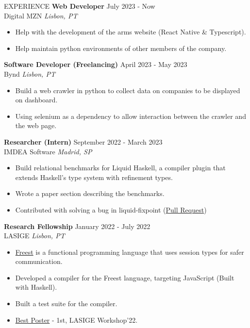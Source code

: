 \documentclass{resume} %
\begin{document}

\begin{rSection}{EXPERIENCE}
  \textbf{Web Developer} \hfill July 2023 - Now\\
  Digital MZN \hfill \textit{Lisbon, PT}
  \begin{itemize}
    \itemsep -3pt {}
  \item Help with the development of the arms website (React Native \& Typescript).
  \item Help maintain python environments of other members of the company.
  \end{itemize}
  
  \textbf{Software Developer (Freelancing)} \hfill April 2023 - May 2023\\
  Bynd \hfill \textit{Lisbon, PT}
  \begin{itemize}
    \itemsep -3pt {}    
  \item Build a web crawler in python to collect data on companies to
    be displayed on dashboard.
  \item Using selenium as a dependency to allow interaction between the
    crawler and the web page.
  \end{itemize}

  \textbf{Researcher (Intern)} \hfill September 2022 - March 2023\\
  IMDEA Software \hfill \textit{Madrid, SP}
  \begin{itemize}
    \itemsep -3pt {}
  \item Build relational benchmarks for Liquid Haskell, a compiler plugin that extends Haskell’s type system with refinement types.
  \item Wrote a paper section describing the benchmarks.
  \item Contributed with solving a bug in liquid-fixpoint    (\href{https://github.com/ucsd-progsys/liquid-fixpoint/pull/626}{Pull Request})
  \end{itemize}
  
  \textbf{Research Fellowship} \hfill January 2022 - July 2022\\
  LASIGE \hfill \textit{Lisbon, PT}
  \begin{itemize}
    \itemsep -3pt {}
  \item \href{http://rss.di.fc.ul.pt/tryit/FreeST}{Freest} is a functional programming language
    that uses session types for safer communication.
  \item Developed a compiler for the Freest language, targeting JavaScript (Built with Haskell).
  \item Built a test suite for the compiler.
  \item \href{https://alf0nso.github.io/Alf0nso/docs/FreeSTwebCompiler.pdf}{Best Poster} - 1st, LASIGE Workshop'22.
  \end{itemize}


\end{rSection}
\end{document}
